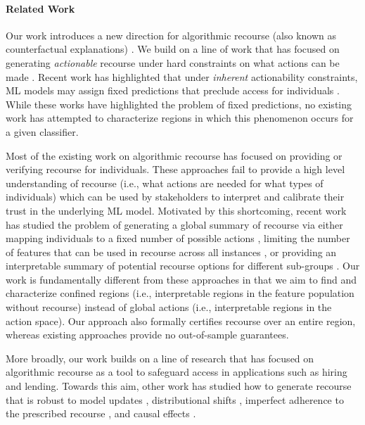 \paragraph{Related Work}

Our work introduces a new direction for algorithmic recourse (also known as counterfactual explanations) \cite{venkatasubramanian2020philosophical, karimi2020survey}. We build on a line of work that has focused on generating \emph{actionable} recourse under hard constraints on what actions can be made \cite{ustun2019actionable, russell2019efficient, mahajan2019preserving, mothilal2020explaining, kanamori2021ordered, karimi2020model}. Recent work has highlighted that under \emph{inherent} actionability constraints, ML models may assign fixed predictions that preclude access for individuals \cite{kothari2023prediction, dominguez2022adversarial, karimi2021algorithmic}. While these works have highlighted the problem of fixed predictions, no existing work has attempted to characterize regions in which this phenomenon occurs for a given classifier.

Most of the existing work on algorithmic recourse has focused on providing or verifying recourse for individuals. These approaches fail to provide a high level understanding of recourse (i.e., what actions are needed for what types of individuals) which can be used by stakeholders to interpret and calibrate their trust in the underlying ML model. Motivated by this shortcoming, recent work has studied the problem of generating a global summary of recourse via either mapping individuals to a fixed number of possible actions \cite{lodi2024one, ley2023globe, warren2024explaining}, limiting the number of features that can be used in recourse across all instances \cite{carrizosa2024generating}, or providing an interpretable summary of potential recourse options for different sub-groups \cite{rawal2020beyond}. Our work is fundamentally different from these approaches in that we aim to find and characterize confined regions (i.e., interpretable regions in the feature population without recourse) instead of global actions (i.e., interpretable regions in the action space). Our approach also formally certifies recourse over an entire region, whereas existing approaches provide no out-of-sample guarantees.

More broadly, our work builds on a line of research that has focused on algorithmic recourse as a tool to safeguard access in applications such as hiring and lending. Towards this aim, other work has studied how to generate recourse that is robust to model updates \cite{upadhyay2021towards, forel2024don}, distributional shifts \cite{altmeyer2023endogenous, guo2022rocoursenet, hardt2023algorithmic, o2022toward, rawal2020algorithmic}, imperfect adherence to the prescribed recourse \cite{pawelczyk2022algorithmic, virgolin2023robustness, maragno2024finding}, and causal effects \cite{mahajan2019preserving, karimi2020algorithmic, kleinberg2020classifiers}. 
